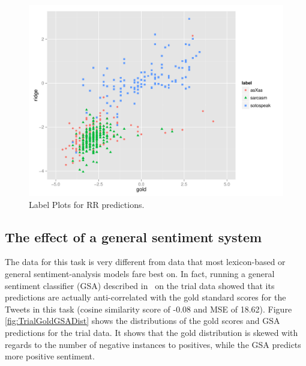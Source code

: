 \documentclass[11pt,letterpaper]{article}
\begin{document}

\begin{figure}[ht!]
    \centering
    \includegraphics[width=1.05\columnwidth]{trialplotv2.pdf}
    \caption{Label Plots for {\sc RR} predictions.}
    \label{fig:LabelPlot.Sarc.soto.asX}
\end{figure}


\subsection*{The effect of a general sentiment system}
The data for this task is very different from data that most lexicon-based or general sentiment-analysis models fare best on. In fact, running a general sentiment classifier (GSA) described in~ on the trial data showed that its predictions are actually anti-correlated with the gold standard scores for the Tweets in this task (cosine similarity score of -0.08 and MSE of
18.62). Figure \ref{fig:TrialGoldGSADist} shows the distributions of the gold scores and GSA predictions for the trial data. It shows that the gold distribution is skewed with regards to the number of negative instances to positives, while the GSA predicts more positive sentiment.
\end{document}
